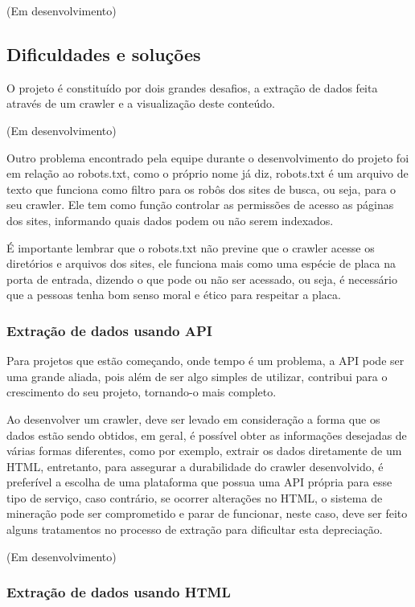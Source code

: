 \documentclass[12pt]{article}
\begin{document}
(Em desenvolvimento)

\subsection{Dificuldades e soluções}

O projeto é constituído por dois grandes desafios, a extração de dados feita através de um crawler e a visualização deste conteúdo. 

(Em desenvolvimento)

Outro problema encontrado pela equipe durante o desenvolvimento do projeto foi em relação ao robots.txt, como o próprio nome já diz, robots.txt é um arquivo de texto que funciona como filtro para os robôs dos sites de busca, ou seja, para o seu crawler. Ele tem como função controlar as permissões de acesso as páginas dos sites, informando quais dados podem ou não serem indexados.

É importante lembrar que o robots.txt não previne que o crawler acesse os diretórios e arquivos dos sites, ele funciona mais como uma espécie de placa na porta de entrada, dizendo o que pode ou não ser acessado, ou seja, é necessário que a pessoas tenha bom senso moral e ético para respeitar a placa.

\subsubsection{Extração de dados usando API}

Para projetos que estão começando, onde tempo é um problema, a API pode ser uma grande aliada, pois além de ser algo simples de utilizar, contribui para o crescimento do seu projeto, tornando-o mais completo.

Ao desenvolver um crawler, deve ser levado em consideração a forma que os dados estão sendo obtidos, em geral, é possível obter as informações desejadas de várias formas diferentes, como por exemplo, extrair os dados diretamente de um HTML, entretanto, para assegurar a durabilidade do crawler desenvolvido, é preferível a escolha de uma plataforma que possua uma API própria para esse tipo de serviço, caso contrário, se ocorrer alterações no HTML, o sistema de mineração pode ser comprometido e parar de funcionar, neste caso, deve ser feito alguns tratamentos no processo de extração para dificultar esta depreciação.

(Em desenvolvimento)

\subsubsection{Extração de dados usando HTML}
\end{document}
